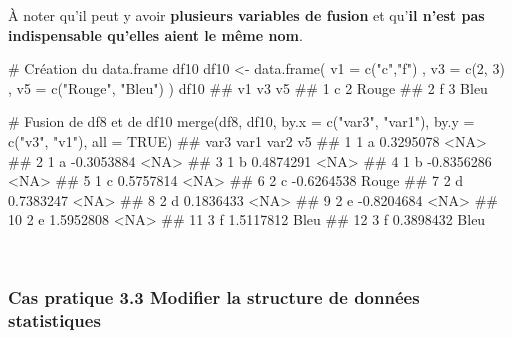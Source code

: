 \documentclass[12pt,twosided, notitlepage]{book}
\newenvironment{Shaded}{}{}
\newcommand{\KeywordTok}[1]{\textcolor[rgb]{0.00,0.00,1.00}{{#1}}}
\newcommand{\DataTypeTok}[1]{{#1}}
\newcommand{\DecValTok}[1]{{#1}}
\newcommand{\StringTok}[1]{\textcolor[rgb]{0.00,0.50,0.50}{{#1}}}
\newcommand{\CommentTok}[1]{\textcolor[rgb]{0.00,0.50,0.00}{{#1}}}
\newcommand{\OtherTok}[1]{\textcolor[rgb]{1.00,0.25,0.00}{{#1}}}
\newcommand{\NormalTok}[1]{{#1}}
\renewenvironment{Shaded}{\begin{snugshade}}{\end{snugshade}}
\begin{document}
À noter qu'il peut y avoir \textbf{plusieurs variables de fusion} et
qu'\textbf{il n'est pas indispensable qu'elles aient le même nom}.

\begin{Shaded}
\begin{Highlighting}[]
\CommentTok{# Création du data.frame df10}
\NormalTok{df10 <-}\StringTok{ }\KeywordTok{data.frame}\NormalTok{(}
  \DataTypeTok{v1 =} \KeywordTok{c}\NormalTok{(}\StringTok{"c"}\NormalTok{,}\StringTok{"f"}\NormalTok{)}
  \NormalTok{, }\DataTypeTok{v3 =} \KeywordTok{c}\NormalTok{(}\DecValTok{2}\NormalTok{, }\DecValTok{3}\NormalTok{)}
  \NormalTok{, }\DataTypeTok{v5 =} \KeywordTok{c}\NormalTok{(}\StringTok{"Rouge"}\NormalTok{, }\StringTok{"Bleu"}\NormalTok{)}
\NormalTok{)}
\NormalTok{df10}
  \NormalTok{##   v1 v3    v5}
  \NormalTok{## 1  c  2 Rouge}
  \NormalTok{## 2  f  3  Bleu}

\CommentTok{# Fusion de df8 et de df10}
\KeywordTok{merge}\NormalTok{(df8, df10, }\DataTypeTok{by.x =} \KeywordTok{c}\NormalTok{(}\StringTok{"var3"}\NormalTok{, }\StringTok{"var1"}\NormalTok{), }\DataTypeTok{by.y =} \KeywordTok{c}\NormalTok{(}\StringTok{"v3"}\NormalTok{, }\StringTok{"v1"}\NormalTok{), }\DataTypeTok{all =} \OtherTok{TRUE}\NormalTok{)}
  \NormalTok{##    var3 var1       var2    v5}
  \NormalTok{## 1     1    a  0.3295078  <NA>}
  \NormalTok{## 2     1    a -0.3053884  <NA>}
  \NormalTok{## 3     1    b  0.4874291  <NA>}
  \NormalTok{## 4     1    b -0.8356286  <NA>}
  \NormalTok{## 5     1    c  0.5757814  <NA>}
  \NormalTok{## 6     2    c -0.6264538 Rouge}
  \NormalTok{## 7     2    d  0.7383247  <NA>}
  \NormalTok{## 8     2    d  0.1836433  <NA>}
  \NormalTok{## 9     2    e -0.8204684  <NA>}
  \NormalTok{## 10    2    e  1.5952808  <NA>}
  \NormalTok{## 11    3    f  1.5117812  Bleu}
  \NormalTok{## 12    3    f  0.3898432  Bleu}
\end{Highlighting}
\end{Shaded}

~

\subsubsection{\texorpdfstring{\textbf{Cas pratique 3.3} Modifier la
structure de données
statistiques}{Cas pratique 3.3 Modifier la structure de données statistiques}}\label{cas-pratique-3.3-modifier-la-structure-de-donnees-statistiques}

\end{document}
